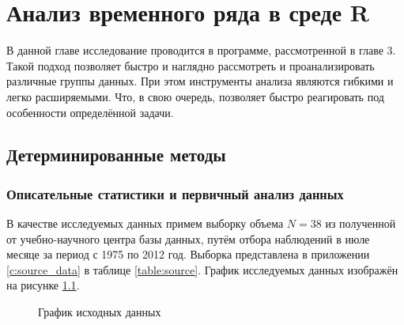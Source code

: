 
\newcommand{\inp}[1]{}
\newcommand{\characteristic}[2]{\inp{#1/characteristics/#2}}
\newcommand{\descriptive}[2]{\inp{#1/descriptive/#2}}
\newcommand{\test}[3]{\inp{#1/test/#2/#3}}
\newcommand{\normaldistr}{$\mathcal{N}(\descriptive{original}{mean}, \descriptive{original}{variance})$}
\newcommand{\resnormaldistr}{$\mathcal{N}(\descriptive{residual}{mean}, \descriptive{residual}{variance})$}

\newpage

\chapter{Анализ временного ряда в среде R}

В данной главе исследование проводится в программе, рассмотренной в главе 3. Такой подход позволяет быстро и наглядно рассмотреть и проанализировать различные группы данных. При этом инструменты анализа являются гибкими и легко расширяемыми. Что, в свою очередь, позволяет быстро реагировать под особенности определённой задачи.

\section{Детерминированные методы} %
\label{sec:determenistic}

\subsection{Описательные статистики и первичный анализ данных} %
\label{sec:basis}

В качестве исследуемых данных примем выборку объема $ N = 38 $ из полученной от учебно-научного центра базы данных, путём отбора наблюдений в июле месяце за период с 1975 по 2012 год. Выборка представлена в приложении \ref{c:source_data} в таблице \ref{table:source}. График исследуемых данных изображён на рисунке \ref{img:input}.
\begin{figure}[ht]
\caption{График исходных данных}
\label{img:input}
\end{figure}

